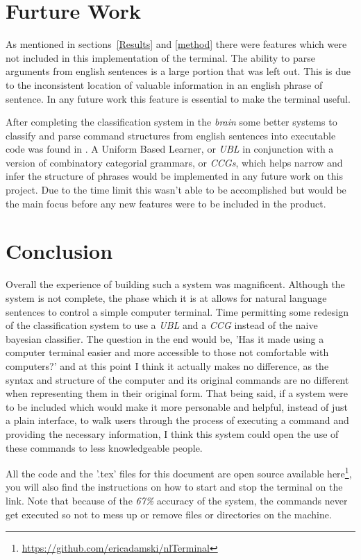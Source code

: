 \documentclass[12pt]{article}
\begin{document}
\section{Furture Work}

As mentioned in sections~\ref{Results} and \ref{method} there were features which were not included in this implementation of the terminal. The ability to parse arguments from english sentences is a large portion that was left out. This is due to the inconsistent location of valuable information in an english phrase of sentence. In any future work this feature is essential to make the terminal useful.

After completing the classification system in the {\it brain} some better systems to classify and parse command structures from english sentences into executable code was found in \cite{matuszek}. A Uniform Based Learner, or {\it UBL} in conjunction with a version of combinatory categorial grammars, or {\it CCGs}, which helps narrow and infer the structure of phrases would be implemented in any future work on this project. Due to the time limit this wasn't able to be accomplished but would be the main focus before any new features were to be included in the product.

\section{Conclusion}

Overall the experience of building such a system was magnificent. Although the system is not complete, the phase which it is at allows for natural language sentences to control a simple computer terminal. Time permitting some redesign of the classification system to use a {\it UBL} and a {\it CCG} instead of the naive bayesian classifier. The question in the end would be, 'Has it made using a computer terminal easier and more accessible to those not comfortable with computers?' and at this point I think it actually makes no difference, as the syntax and structure of the computer and its original commands are no different when representing them in their original form. That being said, if a system were to be included which would make it more personable and helpful, instead of just a plain interface, to walk users through the process of executing a command and providing the necessary information, I think this system could open the use of these commands to less knowledgeable people.

All the code and the '.tex' files for this document are open source available here\footnote{\url{https://github.com/ericadamski/nlTerminal}}, you will also find the instructions on how to start and stop the terminal on the link. Note that because of the {\it 67\%} accuracy of the system, the commands never get executed so not to mess up or remove files or directories on the machine.



\end{document}
